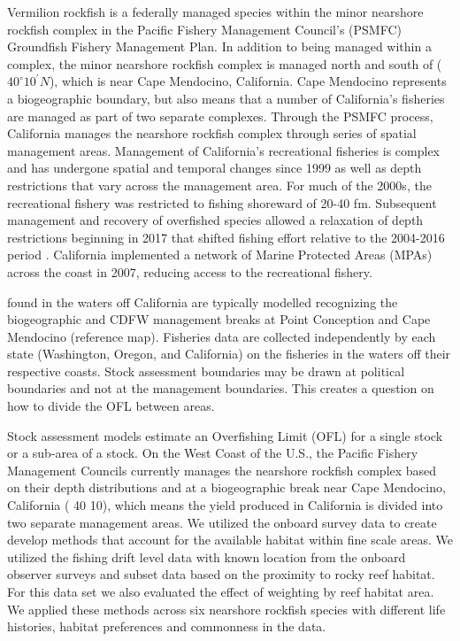 \documentclass[
  12pt,
  authoryear,
  preprint,
  3p]{elsarticle}
\begin{document}
Vermilion rockfish is a federally managed species within the minor
nearshore rockfish complex in the Pacific Fishery Management Council's
(PSMFC) Groundfish Fishery Management Plan. In addition to being managed
within a complex, the minor nearshore rockfish complex is managed north
and south of (\(40^\circ 10^\prime N\)), which is near Cape Mendocino,
California. Cape Mendocino represents a biogeographic boundary, but also
means that a number of California's fisheries are managed as part of two
separate complexes. Through the PSMFC process, California manages the
nearshore rockfish complex through series of spatial management areas.
Management of California's recreational fisheries is complex and has
undergone spatial and temporal changes since 1999 as well as depth
restrictions that vary across the management area. For much of the
2000s, the recreational fishery was restricted to fishing shoreward of
20-40 fm. Subsequent management and recovery of overfished species
allowed a relaxation of depth restrictions beginning in 2017 that
shifted fishing effort relative to the 2004-2016 period
\citep{Monk:2021:SVR}. California implemented a network of Marine
Protected Areas (MPAs) across the coast in 2007, reducing access to the
recreational fishery.

found in the waters off California are typically modelled recognizing
the biogeographic and CDFW management breaks at Point Conception and
Cape Mendocino (reference map). Fisheries data are collected
independently by each state (Washington, Oregon, and California) on the
fisheries in the waters off their respective coasts. Stock assessment
boundaries may be drawn at political boundaries and not at the
management boundaries. This creates a question on how to divide the OFL
between areas.

Stock assessment models estimate an Overfishing Limit (OFL) for a single
stock or a sub-area of a stock. On the West Coast of the U.S., the
Pacific Fishery Management Councils currently manages the nearshore
rockfish complex based on their depth distributions and at a
biogeographic break near Cape Mendocino, California ( 40 10), which
means the yield produced in California is divided into two separate
management areas. We utilized the onboard survey data to create develop
methods that account for the available habitat within fine scale areas.
We utilized the fishing drift level data with known location from the
onboard observer surveys and subset data based on the proximity to rocky
reef habitat. For this data set we also evaluated the effect of
weighting by reef habitat area. We applied these methods across six
nearshore rockfish species with different life histories, habitat
preferences and commonness in the data.
\end{document}
